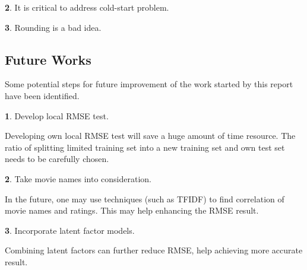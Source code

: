 \documentclass{ece}
\begin{document}
\textbf{2}. It is critical to address cold-start problem.

\textbf{3}. Rounding is a bad idea.

\subsection{Future Works}

Some potential steps for future improvement of the work started by this report have been identified.

\textbf{1}. Develop local RMSE test.

Developing own local RMSE test will save a huge amount of time resource. The ratio of splitting limited training set into a new training set and own test set needs to be carefully chosen. 

\textbf{2}. Take movie names into consideration.

In the future, one may use techniques (such as TFIDF) to find correlation of movie names and ratings.
This may help enhancing the RMSE result.

\textbf{3}. Incorporate latent factor models.

Combining latent factors can further reduce RMSE, help achieving more accurate result.


\printbibliography[heading=none]


%
%
\end{document}
